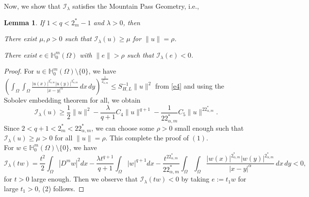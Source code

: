 \documentclass[reqno]{amsart}
\newtheorem{lemma}[theorem]{Lemma}
\newcommand{\la} {\lambda}
\newcommand{\Om}{\Omega}
\newcommand{\al} {\alpha}
\newcommand{\noi} {  \noindent}
\newcommand{\mb} {\mathbb}
\newcommand{\mc} {\mathcal}
\numberwithin{theorem}{section} \numberwithin{equation}{section}
\begin{document}
\noi Now, we show that $\mc{I}_{\la}$ satisfies the Mountain Pass Geometry, i.e.,
\begin{lemma}\label{l1}
If $1<q<2^{*}_{m}-1$ and ${\la}>0$, then
\item[(1)] There exist $\mu, \rho>0$ such that $\mc I_\la(u)\geq \mu$ for $\|u\|=\rho$.
\item[(2)] There exist $e\in \mb{H}^m_0(\Om)$ with $\|e\|>{\rho}$ such that $\mc I_\la(e)<0$.
\end{lemma}
\begin{proof} For $u\in\mb{H}_0^{m}(\Om)\setminus\{0\}$, we have 
$\left({ \int_\Om \int_\Om \frac{|u(x)|^{2_{\al, m}^*}|u(y)|^{2_{\al, m}^*}}{|x - y|^\al} \,dx \,dy } \right)^ \frac{1}{2_{\al, m}^*}
\leq S_{H, L}^{-1}\|u\|^2$ from \eqref{e4} and using the Sobolev embedding theorem for all, we obtain
\[\mc I_\la(u)\geq \frac{1}{2}\|u\|^2  -\frac{\la}{q+1}C_4 \|u\|^{q+1}-\frac{1}{22^*_{\al, m}}C_5\|u\|^{22^*_{\al, m}}.\]
Since $2<q+1<2^*_{m}<{22^*_{\al, m}}$, we can choose some $\rho>0$ small enough such that $\mc I_\la(u)\geq\mu>0$ for all $\|u\|=\rho$.
This complete the proof of $(1)$.\\
For $w\in\mb{H}_0^{m}(\Om)\setminus\{0\}$, we have
\[\mc I_\la(tw)= \frac{t^2}{2}\int_{\Om}|D^{m}w|^2 dx -\frac{\la t^{q+1}}{q+1}\int_{\Om}|w|^{q+1} dx-\frac{t^{22^*_{\al, m}}}{22^*_{\al, m}}\int_{\Om}\int_{\Om} \frac{|w(x)|^{2_{\al, m}^{*}}|w(y)|^{2_{\al,m}^{*}}}{|x-y|^{\al}}\,dx \,dy <0,\]
for $t>0$ large enough. Then we observe that $\mc I_\la(tw)<0$ by taking $e:=t_1w$ for large $t_1>0$, (2) follows.
\end{proof}
\end{document}
